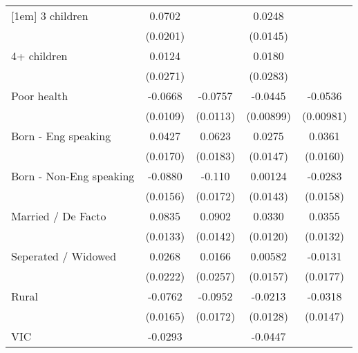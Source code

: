 {\begin{tabular}{l*{4}{c}}
[1em]
3 children          &      0.0702\sym{***}&                     &      0.0248         &                     \\
                    &    (0.0201)         &                     &    (0.0145)         &                     \\
[1em]
4+ children         &      0.0124         &                     &      0.0180         &                     \\
                    &    (0.0271)         &                     &    (0.0283)         &                     \\
[1em]
Poor health         &     -0.0668\sym{***}&     -0.0757\sym{***}&     -0.0445\sym{***}&     -0.0536\sym{***}\\
                    &    (0.0109)         &    (0.0113)         &   (0.00899)         &   (0.00981)         \\
[1em]
Born - Eng speaking &      0.0427\sym{*}  &      0.0623\sym{***}&      0.0275         &      0.0361\sym{*}  \\
                    &    (0.0170)         &    (0.0183)         &    (0.0147)         &    (0.0160)         \\
[1em]
Born - Non-Eng speaking&     -0.0880\sym{***}&      -0.110\sym{***}&     0.00124         &     -0.0283         \\
                    &    (0.0156)         &    (0.0172)         &    (0.0143)         &    (0.0158)         \\
[1em]
Married / De Facto  &      0.0835\sym{***}&      0.0902\sym{***}&      0.0330\sym{**} &      0.0355\sym{**} \\
                    &    (0.0133)         &    (0.0142)         &    (0.0120)         &    (0.0132)         \\
[1em]
Seperated / Widowed &      0.0268         &      0.0166         &     0.00582         &     -0.0131         \\
                    &    (0.0222)         &    (0.0257)         &    (0.0157)         &    (0.0177)         \\
[1em]
Rural               &     -0.0762\sym{***}&     -0.0952\sym{***}&     -0.0213         &     -0.0318\sym{*}  \\
                    &    (0.0165)         &    (0.0172)         &    (0.0128)         &    (0.0147)         \\
[1em]
VIC                 &     -0.0293\sym{*}  &                     &     -0.0447\sym{***}&                     \\

\end{tabular}}
